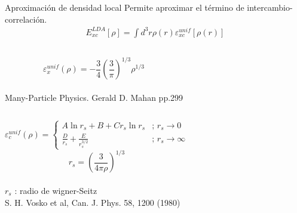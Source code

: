 \begin{frame}{Aproximaci\'on de densidad local}
Permite aproximar el t\'ermino de intercambio-correlaci\'on.
\begin{eqnarray}
E_{xc}^{LDA} [\rho ] = \int d^{3}r \rho (r) \varepsilon _{xc}^{unif} [\rho 
(r)] \nonumber
\end{eqnarray}
\begin{columns}[t]
        \[   \varepsilon _{x}^{unif} (\rho ) = -\frac{3}{4} \left( \frac{3}{\pi 
        } \right) 
        ^{1/3} \rho ^{1/3}\]
    \\
    {\scriptsize Many-Particle Physics. Gerald D. Mahan pp.299}
\end{columns}

\begin{columns}[t]
\[    \varepsilon _{c}^{unif} (\rho ) = \left\{ \begin{array}{ll}
A \ln r_{s} + B + C r_{s} \ln r_{s} & \textrm{; } r_{s} \to 0 \\ 
\frac{D}{r_{s}} + \frac{E}{r_{s}^{3/2}} & \textrm{; } r_{s} \to \infty
\end{array} \right.\]
\[
r_{s} = \left( \frac{3}{4\pi \rho} \right)^{1/3}
\]
    \\
$r_{s}$ : radio de wigner-Seitz \\
{\scriptsize S. H. Vosko et al, Can. J. Phys. 58, 1200 (1980)}
\end{columns}
\end{frame}
